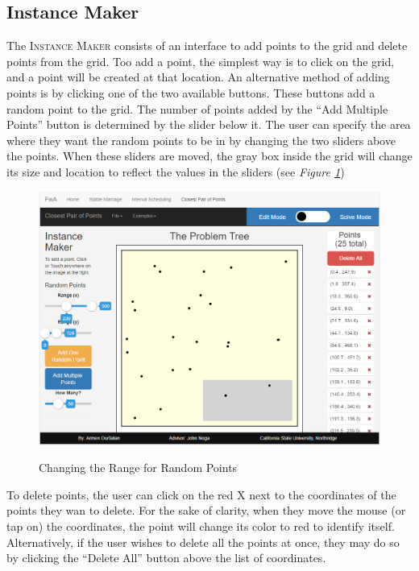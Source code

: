 \subsection{Instance Maker}
The \textsc{Instance Maker} consists of an interface to add points to the grid
and delete points from the grid. Too add a point, the simplest way is to 
click on the grid, and a point will be created at that location. 
An alternative method of adding points is by clicking one of the two available buttons.
These buttons add a random point to the grid. 
The number of points added by the ``Add Multiple Points'' 
button is determined by the slider below it.
\newline\newline
The user can specify the area where they want the random points to be in 
by changing the two sliders above the points. 
When these sliders are moved, the gray box inside the grid will change its size
and location to reflect the values in the sliders 
(see \textit{Figure \ref{fig-cpop-range}})
\newline\newline
\begin{figure}[H]
	\caption{Changing the Range for Random Points}
	\includegraphics[width=\linewidth]
	{images/closest-pair-of-points/cpop-range.png}
	\label{fig-cpop-range}
	\centering
\end{figure}
\hspace{-0.3in}
To delete points, the user can click on the red X next to the coordinates
of the points they wan to delete. For the sake of clarity, when they 
move the mouse (or tap on) the coordinates, the point will change its 
color to red to identify itself. Alternatively, if the user wishes 
to delete all the points at once, they may do so by clicking the ``Delete All'' 
button above the list of coordinates. 
